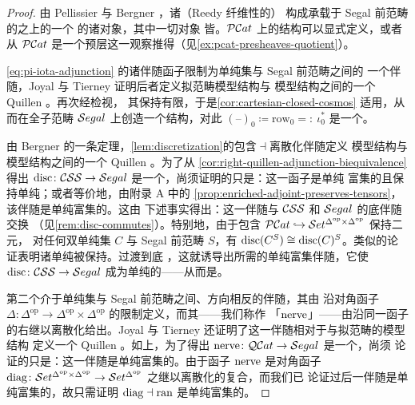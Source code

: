 \begin{proof}
由 Pellissier 与 Bergner \cite{bib90,bib13,bib14}，诸（Reedy 纤维性的）%
\trSegalCategories{}构成承载于 Segal 前范畴的\trCategory{}之上的一个%
\trCartesianClosed{}\trModelStructure{}的诸\trFibrant{}对象，其中一切对象
皆\trCofibrant。$\mathcal{P}\mathcal{C}at$ 上的\trCartesianClosed{}结构可以显式定义，或者从
$\mathcal{P}\mathcal{C}at$ 是一个预层\trCategory{}这一观察推得（见\cref{ex:pcat-presheaves-quotient}）。

\eqref{eq:pi-iota-adjunction} 的诸伴随函子限制为单纯集与 Segal 前范畴之间的
一个伴随，Joyal 与 Tierney 证明后者定义拟范畴模型结构与\trSegalCategories{}%
模型结构之间的一个 Quillen \trEquivalence{} \cite[5.6]{bib64}。再次经检视，
其\trLeftAdjoint{}保持有限\trProduct，于是\cref{cor:cartesian-closed-cosmos}
适用，从而在全子范畴 $\mathcal{S}egal$ 上创造一个\trCartesianClosed{}\trInfinityCosmos{}结构，对此 $(\text{--})_{0}\coloneqq\mathrm{row}_{0}=:\ \iota_{0}^{*}$ 是一个\trCosmologicalBiequivalence。

由 Bergner 的一条定理，\cref{lem:discretization}的包含$\dashv$离散化伴随定义%
\trCompleteSegalSpaces{}模型结构与\trSegalCategories{}模型结构之间的一个
Quillen \trEquivalence{} \cite[\S6]{bib14}。为了从%
\cref{cor:right-quillen-adjunction-biequivalence}得出 $\mathrm{disc}\colon\mathcal{C}\mathcal{S}\mathcal{S}\to\mathcal{S}egal$ 是一个\trCosmologicalBiequivalence，尚须证明的只是：这一函子是单纯
富集的且保持单纯\trCotensor；或者等价地，由附录 A 中的%
\cref{prop:enriched-adjoint-preserves-tensors}，该伴随是单纯富集的。这由
下述事实得出：这一伴随与 $\mathcal{C}\mathcal{S}\mathcal{S}$ 和 $\mathcal{S}egal$ 的底\trQuasiCategory{}伴随交换
（见\cref{rem:disc-commutes}）。特别地，由于包含 $\mathcal{P}\mathcal{C}at\hookrightarrow\mathcal{S}et^{\Delta^{\mathrm{op}}\times\Delta^{\mathrm{op}}}$ 保持二元\trProduct，
对任何双单纯集 $C$ 与 Segal 前范畴 $S$，有 $\mathrm{disc}(C^{S})\cong\mathrm{disc}(C)^{S}$。类似的论证表明诸单纯\trCotensor{}被保持。过渡到底%
\trQuasiCategory，这就诱导出所需的单纯富集伴随，它使 $\mathrm{disc}\colon\mathcal{C}\mathcal{S}\mathcal{S}\to\mathcal{S}egal$ 成为单纯的——从而是\trCosmological。

第二个介于单纯集与 Segal 前范畴之间、方向相反的伴随，其\trLeftAdjoint{}由
沿对角函子 $\Delta\colon\Delta^{\mathrm{op}}\to\Delta^{\mathrm{op}}\times\Delta^{\mathrm{op}}$ 的限制定义，而其\trRightAdjoint{}——我们称作
「$\mathrm{nerve}$」——由沿同一函子的右\trKanExtension{}继以离散化给出。Joyal 与
Tierney 还证明了这一伴随相对于\trCompleteSegalSpaces{}与拟范畴的模型结构
定义一个 Quillen \trEquivalence{} \cite[5.7]{bib64}。如上，为了得出
$\mathrm{nerve}\colon\mathcal{Q}\mathcal{C}at\to\mathcal{S}egal$ 是一个\trCosmologicalBiequivalence，尚须
论证的只是：这一伴随是单纯富集的。由于函子 $\mathrm{nerve}$ 是对角函子
$\mathrm{diag}\colon\mathcal{S}et^{\Delta^{\mathrm{op}}\times\Delta^{\mathrm{op}}}\to\mathcal{S}et^{\Delta^{\mathrm{op}}}$ 之\trRightAdjoint{}继以离散化的复合，而我们已
论证过后一伴随是单纯富集的，故只需证明 $\mathrm{diag}\dashv\mathrm{ran}$ 是单纯富集的。


\end{proof}
